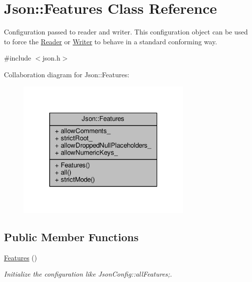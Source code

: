 \hypertarget{classJson_1_1Features}{}\section{Json\+:\+:Features Class Reference}
\label{classJson_1_1Features}


Configuration passed to reader and writer. This configuration object can be used to force the \hyperlink{classJson_1_1Reader}{Reader} or \hyperlink{classJson_1_1Writer}{Writer} to behave in a standard conforming way.  




{\ttfamily \#include $<$json.\+h$>$}



Collaboration diagram for Json\+:\+:Features\+:
\nopagebreak
\begin{figure}[H]
\begin{center}
\leavevmode
\includegraphics[width=244pt]{de/d62/classJson_1_1Features__coll__graph}
\end{center}
\end{figure}
\subsection*{Public Member Functions}
\begin{DoxyCompactItemize}
\item 
\hyperlink{classJson_1_1Features_ad15a091cb61bb31323299a95970d2644}{Features} ()\hypertarget{classJson_1_1Features_ad15a091cb61bb31323299a95970d2644}{}\label{classJson_1_1Features_ad15a091cb61bb31323299a95970d2644}

\begin{DoxyCompactList}\small\item\em Initialize the configuration like Json\+Config\+::all\+Features;. \end{DoxyCompactList}\end{DoxyCompactItemize}
